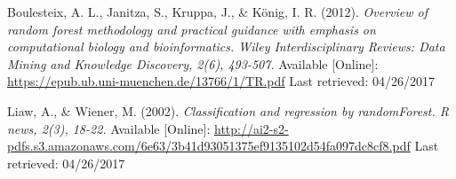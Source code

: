 \documentclass[12pt,a4paper]{article}
\begin{document}
\begin{thebibliography}{9}
		Boulesteix, A. L., Janitza, S., Kruppa, J., \& König, I. R. (2012).
		\textit{Overview of random forest methodology and practical guidance with emphasis on computational biology and bioinformatics. Wiley Interdisciplinary Reviews: Data Mining and Knowledge Discovery, 2(6), 493-507. }
		Available [Online]: \url{https://epub.ub.uni-muenchen.de/13766/1/TR.pdf} Last retrieved: 04/26/2017

		Liaw, A., \& Wiener, M. (2002). 
		\textit{Classification and regression by randomForest. R news, 2(3), 18-22.}
		Available [Online]: \url{http://ai2-s2-pdfs.s3.amazonaws.com/6e63/3b41d93051375ef9135102d54fa097dc8cf8.pdf} Last retrieved: 04/26/2017
	    
	\end{thebibliography}
\end{document}
